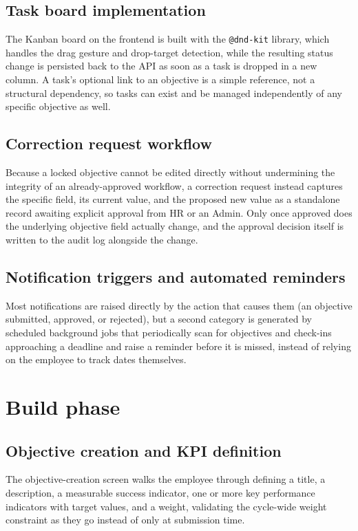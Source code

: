 \documentclass[12pt,a4paper]{report}
\begin{document}
\subsection{Task board implementation}

The Kanban board on the frontend is built with the \texttt{@dnd-kit} library, which handles the drag gesture and drop-target detection, while the resulting status change is persisted back to the API as soon as a task is dropped in a new column. A task's optional link to an objective is a simple reference, not a structural dependency, so tasks can exist and be managed independently of any specific objective as well.

\subsection{Correction request workflow}

Because a locked objective cannot be edited directly without undermining the integrity of an already-approved workflow, a correction request instead captures the specific field, its current value, and the proposed new value as a standalone record awaiting explicit approval from HR or an Admin. Only once approved does the underlying objective field actually change, and the approval decision itself is written to the audit log alongside the change.

\subsection{Notification triggers and automated reminders}

Most notifications are raised directly by the action that causes them (an objective submitted, approved, or rejected), but a second category is generated by scheduled background jobs that periodically scan for objectives and check-ins approaching a deadline and raise a reminder before it is missed, instead of relying on the employee to track dates themselves.

\section{Build phase}

\subsection{Objective creation and KPI definition}

The objective-creation screen walks the employee through defining a title, a description, a measurable success indicator, one or more key performance indicators with target values, and a weight, validating the cycle-wide weight constraint as they go instead of only at submission time.
\end{document}
